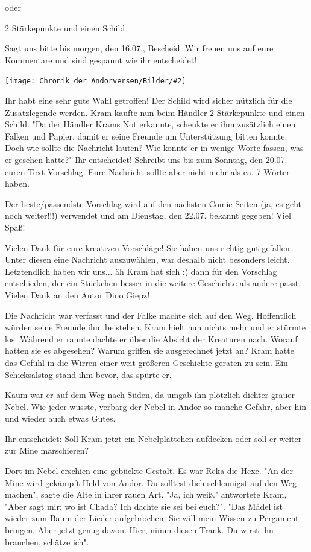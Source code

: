 \documentclass[10pt, a4paper, oneside]{book}
\newcommand{\bildmitts}[2][height=0.32\textwidth,width=0.48\textwidth,keepaspectratio]{%
    \begin{center}
        \texttt{[image: Chronik der Andorversen/Bilder/\#2]}
    \end{center}
}
\begin{document}
\begin{multicols}{2}
oder

2 Stärkepunkte und einen Schild

Sagt uns bitte bis morgen, den 16.07., Bescheid. Wir freuen uns auf eure Kommentare und sind gespannt wie ihr entscheidet!\bigskip



\bildmitts{Der Kampf um Cavern (2014) Zuckerberg.jpeg}

Ihr habt eine sehr gute Wahl getroffen! Der Schild wird sicher nützlich für die Zusatzlegende werden. Kram kaufte nun beim Händler 2 Stärkepunkte und einen Schild. "Da der Händler Krams Not erkannte, schenkte er ihm zusätzlich einen Falken und Papier, damit er seine Freunde um Unterstützung bitten konnte. Doch wie sollte die Nachricht lauten? Wie konnte er in wenige Worte fassen, was er gesehen hatte?" Ihr entscheidet! Schreibt uns bis zum Sonntag, den 20.07. euren Text-Vorschlag. Eure Nachricht sollte aber nicht mehr als ca. 7 Wörter haben.

Der beste/passendste Vorschlag wird auf den nächsten Comic-Seiten (ja, es geht noch weiter!!!) verwendet und am Dienstag, den 22.07. bekannt gegeben! Viel Spaß!\bigskip

Vielen Dank für eure kreativen Vorschläge! Sie haben uns richtig gut gefallen. Unter diesen eine Nachricht auszuwählen, war deshalb nicht besonders leicht. Letztendlich haben wir uns... äh Kram hat sich :) dann für den Vorschlag entschieden, der ein Stückchen besser in die weitere Geschichte als andere passt. Vielen Dank an den Autor Dino Giepz!\bigskip

Die Nachricht war verfasst und der Falke machte sich auf den Weg.
Hoffentlich würden seine Freunde ihm beistehen. Kram hielt nun nichts mehr und er stürmte los. Während er rannte dachte er über die Absicht der Kreaturen nach. Worauf hatten sie es abgesehen? Warum griffen sie ausgerechnet jetzt an? Kram hatte das Gefühl in die Wirren einer weit größeren Geschichte geraten zu sein. Ein Schicksalstag stand ihm bevor, das spürte er.

Kaum war er auf dem Weg nach Süden, da umgab ihn plötzlich dichter grauer Nebel. Wie jeder wusste, verbarg der Nebel in Andor so manche Gefahr, aber hin und wieder auch etwas Gutes.

Ihr entscheidet: Soll Kram jetzt ein Nebelplättchen aufdecken oder soll er weiter zur Mine marschieren? \bigskip

Dort im Nebel erschien eine gebückte Gestalt. Es war Reka die Hexe. "An der Mine wird gekämpft Held von Andor. Du solltest dich schleunigst auf den Weg machen", sagte die Alte in ihrer rauen Art. "Ja, ich weiß." antwortete Kram, "Aber sagt mir: wo ist Chada? Ich dachte sie sei bei euch?". "Das Mädel ist wieder zum Baum der Lieder aufgebrochen. Sie will mein Wissen zu Pergament bringen. Aber jetzt genug davon. Hier, nimm diesen Trank. Du wirst ihn brauchen, schätze ich".


\end{multicols}
\end{document}
